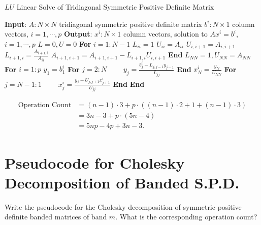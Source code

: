 \documentclass[paper=a4, fontsize=11pt]{scrartcl} %
\numberwithin{equation}{section} %
\numberwithin{figure}{section} %
\numberwithin{table}{section} %
\begin{document}
\begin{algorithm}
\caption{$LU$ Linear Solve of Tridiagonal Symmetric Positive Definite Matrix}\label{lstspdm}
\begin{algorithmic}
\STATE \textbf{Input}: 
\STATE \quad $A: N\times N$ tridiagonal symmetric positive definite matrix
\STATE \quad $b^i: N\times 1$ column vectors, $i=1,\cdots, p$
\STATE \textbf{Output}: $x^i: N\times 1$ column vectors, solution to $A x^i =b^i$, $i=1,\cdots, p$
\newline
\STATE $L=0, U=0$
\STATE \textbf{For} $i=1:N-1$
\STATE \quad $L_{ii} = 1$
\STATE \quad $U_{ii} = A_{ii}$
\STATE \quad $U_{i,i+1} = A_{i,i+1}$
\STATE \quad $L_{i+1,i} = \frac{A_{i+1,i}}{A_{ii}}$
\STATE \quad $A_{i+1,i+1} = A_{i+1,i+1} - L_{i+1,i}U_{i,i+1}$
\STATE \textbf{End}
\STATE $L_{NN}=1, U_{NN}=A_{NN}$
\newline
\STATE \textbf{For} $i=1:p$
\STATE \quad $y_1 = b^i_1$
\STATE \quad \textbf{For} $j=2:N$
    \STATE \quad $\quad\quad y_j = \frac{b^i_j - L_{j,j-1}y_{j-1}}{L_{jj}}$
\STATE \quad \textbf{End}
\newline
\STATE \quad $x^i_N =\frac{y_N}{U_{NN}}$
\STATE \quad \textbf{For} $j=N-1:1$
    \STATE \quad $\quad\quad x^i_j = \frac{y_j - U_{j,j+1}x^i_{j+1}}{U_{jj}}$
\STATE \quad \textbf{End}
\STATE \textbf{End}
\end{algorithmic}
\end{algorithm}
\begin{align}
\begin{split}
\nonumber\text{Operation Count} &= (n-1)\cdot3 + p\cdot((n-1)\cdot2+1+(n-1)\cdot3)\\
&= 3n-3+p\cdot (5n-4)\\
&=5np - 4p + 3n -3.
\end{split}
\end{align}
\newpage

\section{Pseudocode for Cholesky Decomposition of Banded S.P.D.}
Write the pseudocode for the Cholesky decomposition of symmetric positive definite
banded matrices of band $m$. What is the corresponding operation count?
\end{document}
